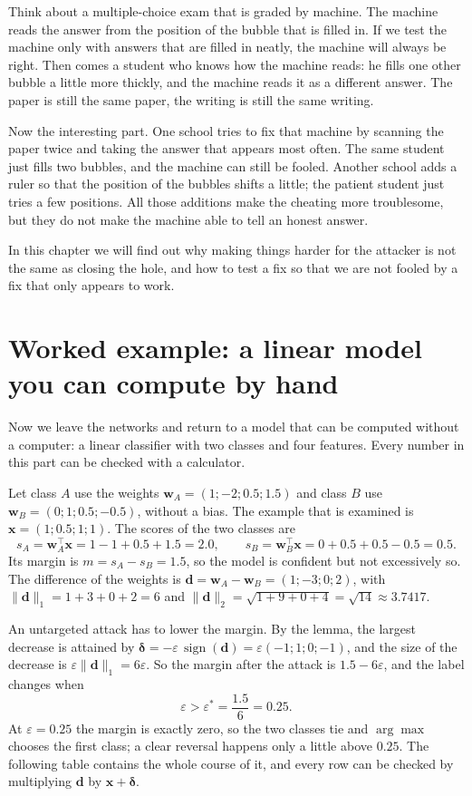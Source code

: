 \begin{untukanak}
Think about a multiple-choice exam that is graded by machine. The machine reads the
answer from the position of the bubble that is filled in. If we test the machine only
with answers that are filled in neatly, the machine will always be right. Then comes a
student who knows how the machine reads: he fills one other bubble a little more
thickly, and the machine reads it as a different answer. The paper is still the same
paper, the writing is still the same writing.

Now the interesting part. One school tries to fix that machine by scanning the paper
twice and taking the answer that appears most often. The same student just fills two
bubbles, and the machine can still be fooled. Another school adds a ruler so that the
position of the bubbles shifts a little; the patient student just tries a few
positions. All those additions make the cheating more troublesome, but they do not
make the machine able to tell an honest answer.

In this chapter we will find out why making things harder for the attacker is not the
same as closing the hole, and how to test a fix so that we are not fooled by a fix
that only appears to work.
\end{untukanak}

\section{Worked example: a linear model you can compute by hand}

Now we leave the networks and return to a model that can be computed without a
computer: a linear classifier with two classes and four features. Every number in this
part can be checked with a calculator.

Let class $A$ use the weights $\mathbf{w}_A=(1;-2;0.5;1.5)$ and class $B$
use $\mathbf{w}_B=(0;1;0.5;-0.5)$, without a bias. The example that is examined is
$\mathbf{x}=(1;0.5;1;1)$. The scores of the two classes are
\[
  s_A=\mathbf{w}_A^{\top}\mathbf{x}=1-1+0.5+1.5=2.0,
  \qquad
  s_B=\mathbf{w}_B^{\top}\mathbf{x}=0+0.5+0.5-0.5=0.5 .
\]
Its margin is $m=s_A-s_B=1.5$, so the model is confident but not excessively so. The
difference of the weights is $\mathbf{d}=\mathbf{w}_A-\mathbf{w}_B=(1;-3;0;2)$, with
$\lVert\mathbf{d}\rVert_1=1+3+0+2=6$ and
$\lVert\mathbf{d}\rVert_2=\sqrt{1+9+0+4}=\sqrt{14}\approx3.7417$.

An untargeted attack has to lower the margin. By the lemma, the largest decrease
is attained by $\boldsymbol{\delta}=-\varepsilon\,\operatorname{sign}(\mathbf{d})
=\varepsilon(-1;1;0;-1)$, and the size of the decrease is
$\varepsilon\lVert\mathbf{d}\rVert_1=6\varepsilon$. So the margin after the attack
is $1.5-6\varepsilon$, and the label changes when
\[
  \varepsilon>\varepsilon^{*}=\frac{1.5}{6}=0.25 .
\]
At $\varepsilon=0.25$ the margin is exactly zero, so the two classes tie and
$\arg\max$ chooses the first class; a clear reversal happens only a little above
$0.25$. The following table contains the whole course of it, and every row can be
checked by multiplying $\mathbf{d}$ by $\mathbf{x}+\boldsymbol{\delta}$.

